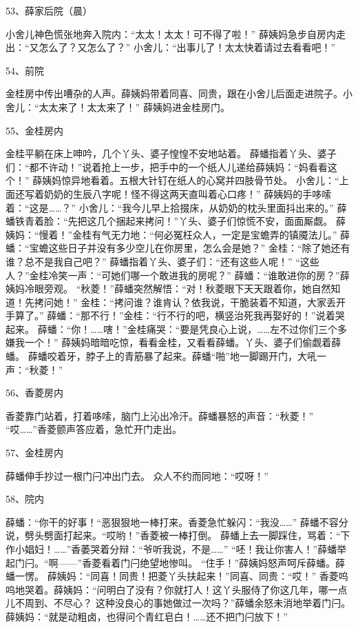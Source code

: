 53、薛家后院（晨）\par
小舍儿神色慌张地奔入院内：“太太！太太！可不得了啦！”
薛姨妈急步自房内走出：“又怎么了？又怎么了？”
小舍儿：“出事儿了！太太快着请过去看看吧！”

54、前院\par
金桂房中传出嘈杂的人声。薛姨妈带着同喜、同贵，跟在小舍儿后面走进院子。小舍儿：“太太来了！太太来了！”
薛姨妈进金桂房门。

55、金桂房内\par
金桂平躺在床上呻吟，几个丫头、婆子惶惶不安地站着。
薛蟠指着丫头、婆子们：“都不许动！”说着抢上一步，把手中的一个纸人儿递给薛姨妈：“妈看看这个！”
薛姨妈惊异地看着。五根大针钉在纸人的心窝并四肢骨节处。
小舍儿：“上面还写着奶奶的生辰八字呢！怪不得这两天直叫着心口疼！”
薛姨妈的手哆嗦着：“这是……？”
小舍儿：“我今儿早上拾掇床，从奶奶的枕头里面抖出来的。”
薛蟠铁青着脸：“先把这几个捆起来拷问！”丫头、婆子们惊慌不安，面面厮觑。
薛姨妈：“慢着！”金桂有气无力地：“何必冤枉众人，一定是宝蟾弄的镇魇法儿。”
薛蟠：“宝蟾这些日子并没有多少空儿在你房里，怎么会是她？”
金桂：“除了她还有谁？总不是我自己吧？”
薛蟠指着丫头、婆子们：“还有这些人呢！”
“这些人？”金桂冷笑一声：“可她们哪一个敢进我的房呢？”
薛蟠：“谁敢进你的房？”薛姨妈冷眼旁观。
“秋菱！”薛蟠突然解悟：“对！秋菱眼下天天跟着你，她自然知道！先拷问她！”
金桂：“拷问谁？谁肯认？依我说，干脆装着不知道，大家丢开手算了。”
薛蟠：“那不行！”金桂：“行不行的吧，横竖治死我再娶好的！”说着哭起来。
薛蟠：“你！……嗐！”金桂痛哭：“要是凭良心上说，……左不过你们三个多嫌我一个！”
薛姨妈暗暗吃惊，看看金桂，又看看薛蟠。丫头、婆子们偷觑着薛蟠。
薛蟠咬着牙，脖子上的青筋暴了起来。薛蟠“啪”地一脚踢开门，大吼一声：“秋菱！”

56、香菱房内\par
香菱靠门站着，打着哆嗦，脑门上沁出冷汗。薛蟠暴怒的声音：“秋菱！”
“哎……”香菱颤声答应着，急忙开门走出。

57、金桂房内\par
薛蟠伸手抄过一根门闩冲出门去。
众人不约而同地：“哎呀！”

58、院内\par
薛蟠：“你干的好事！“恶狠狠地一棒打来。香菱急忙躲闪：“我没……”
薛蟠不容分说，劈头劈面打起来。“哎哟！”香菱被一棒打倒。
薛蟠上去一脚踩住，骂着：“下作小娼妇！……”香萎哭着分辩：“爷听我说，不是……”
“呸！我让你害人！”薛蟠举起门闩。“啊——”香菱看着门闩绝望地惨叫。
“住手！”薛姨妈怒声呵斥薛蟠。薛蟠一愣。
薛姨妈：“同喜！同贵！把菱丫头扶起来！”同喜、同贵：“哎！”
香菱呜呜地哭着。薛姨妈：“问明白了没有？你就打人！这丫头服侍了你这几年，哪一点儿不周到、不尽心？
这种没良心的事她做过一次吗？”薛蟠余怒未消地举着门闩。
薛姨妈：“就是动粗卤，也得问个青红皂白！……还不把门闩放下！”

